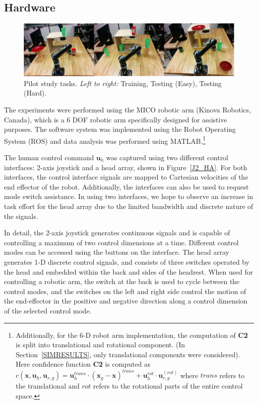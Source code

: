 \documentclass[conference]{IEEEtran}
\begin{document}
 \subsection{Hardware}
 \begin{figure}[ht]
 	\centering
 	\includegraphics[width = 1\hsize]{./figures/TASKS.png}
 	\caption{Pilot study tasks. \textit{Left to right:} Training, Testing (Easy), Testing (Hard).}
 	\label{TASKS}
 \end{figure}
 The experiments were performed using the MICO robotic arm (Kinova Robotics, Canada), which is a 6 DOF robotic arm specifically designed for assistive purposes. The software system was implemented using the Robot Operating System (ROS) and data analysis was performed using MATLAB.\footnote{Additionally, for the 6-D robot arm implementation, the computation of \textbf{C2} is split into translational and rotational component. (In Section~\ref{SIMRESULTS}, only translational components were considered). Here confidence function \textbf{C2} is computed as
 	$c(\boldsymbol{x}, \boldsymbol{u}_h, \boldsymbol{u}_{r,g}) = \boldsymbol{u}_{h}^{trans}\cdot(\boldsymbol{x}_{g} - \boldsymbol{x})^{trans} + \boldsymbol{u}_h^{rot}\cdot\boldsymbol{u}_{r,g}^{(rot)}$
 	where $trans$ refers to the translational and $rot$ refers to the rotational parts of the entire control space.}
 
 The human control command $\boldsymbol{u}_h$ was captured using two different control interfaces: 2-axis joystick and a head array, shown in Figure~\ref{J2_HA}. For both interfaces, the control interface signals are mapped to Cartesian velocities of the end effector of the robot. Additionally, the interfaces can also be used to request mode switch assistance. In using two interfaces, we hope to observe an increase in task effort for the head array due to the limited bandwidth and discrete nature of the signals.
 
 In detail, the 2-axis joystick generates continuous signals and is capable of controlling a maximum of two control dimensions at a time. Different control modes can be accessed using the buttons on the interface. 
 The head array generates 1-D discrete control signals, and consists of three switches operated by the head and embedded within the back and sides of the headrest. When used for controlling a robotic arm, the switch at the back is used to cycle between the control modes, and the switches on the left and right side control the motion of the end-effector in the positive and negative direction along a control dimension of the selected control mode.
 
\end{document}
